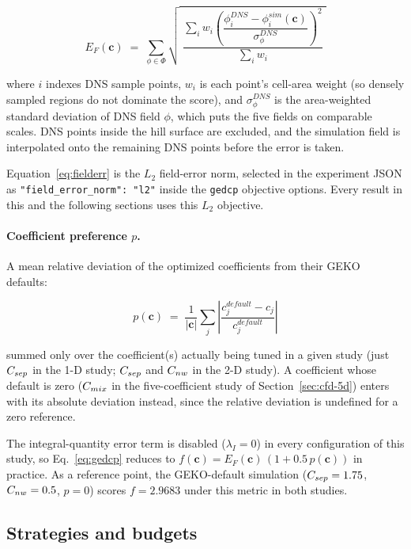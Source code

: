 \begin{equation}
E_F(\mathbf{c}) \;=\; \sum_{\phi \in \Phi}
\sqrt{\; \dfrac{\displaystyle\sum_{i} w_i \left(\dfrac{\phi^{DNS}_i - \phi^{sim}_i(\mathbf{c})}{\sigma^{DNS}_\phi}\right)^{\!2}}
{\displaystyle\sum_i w_i} \;}
\label{eq:fielderr}
\end{equation}

where $i$ indexes DNS sample points, $w_i$ is each point's cell-area
weight (so densely sampled regions do not dominate the score), and
$\sigma^{DNS}_\phi$ is the area-weighted standard deviation of DNS field
$\phi$, which puts the five fields on comparable scales.  DNS points
inside the hill surface are excluded, and the simulation field is
interpolated onto the remaining DNS points before the error is taken.

Equation~\eqref{eq:fielderr} is the $L_2$ field-error norm, selected in the
experiment JSON as \texttt{"field\_error\_norm": "l2"} inside the
\texttt{gedcp} objective options.  Every result in this and the following
sections uses this $L_2$ objective.

\paragraph{Coefficient preference $p$.} A mean relative deviation of the
optimized coefficients from their GEKO defaults:

\begin{equation}
p(\mathbf{c}) \;=\; \frac{1}{|\mathbf{c}|} \sum_{j} \left| \frac{c_j^{default} - c_j}{c_j^{default}} \right|
\label{eq:pref}
\end{equation}

summed only over the coefficient(s) actually being tuned in a given study
(just $C_{sep}$ in the 1-D study; $C_{sep}$ and $C_{nw}$ in the 2-D study).  A
coefficient whose default is zero ($C_{mix}$ in the five-coefficient study of
Section~\ref{sec:cfd-5d}) enters with its absolute deviation instead, since
the relative deviation is undefined for a zero reference.

The integral-quantity error term is disabled ($\lambda_I = 0$) in every
configuration of this study, so Eq.~\eqref{eq:gedcp} reduces to
$f(\mathbf{c}) = E_F(\mathbf{c})\,(1 + 0.5\,p(\mathbf{c}))$ in practice.
As a reference point, the GEKO-default simulation ($C_{sep}=1.75$,
$C_{nw}=0.5$, $p=0$) scores $f = 2.9683$ under this metric in both studies.

\subsection{Strategies and budgets}
\label{sec:cfd-strategies}

